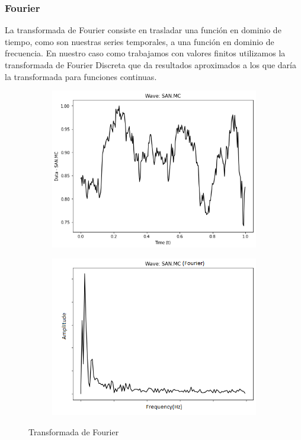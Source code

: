 \documentclass[12pt,a4paper]{article}
\begin{document}
			\subsubsection{Fourier}
			La transformada de Fourier consiste en trasladar una función en dominio de tiempo, como son nuestras series temporales, a una función en dominio de frecuencia. En nuestro caso como trabajamos con valores finitos utilizamos la transformada de Fourier Discreta que da resultados aproximados a los que daría la transformada para funciones continuas. \\
			
\begin{figure}[H]
\centering
\begin{subfigure}{.5\textwidth}
  \centering
  \includegraphics[width=.9\linewidth]{serie normalizada}
  \label{fig:sub1}
\end{subfigure}%
\begin{subfigure}{.5\textwidth}
  \centering
  \includegraphics[width=.9\linewidth]{serie fourier}
  \label{fig:sub2}
\end{subfigure}
\caption{Transformada de Fourier}
\label{fig:test}
\end{figure}
\end{document}
